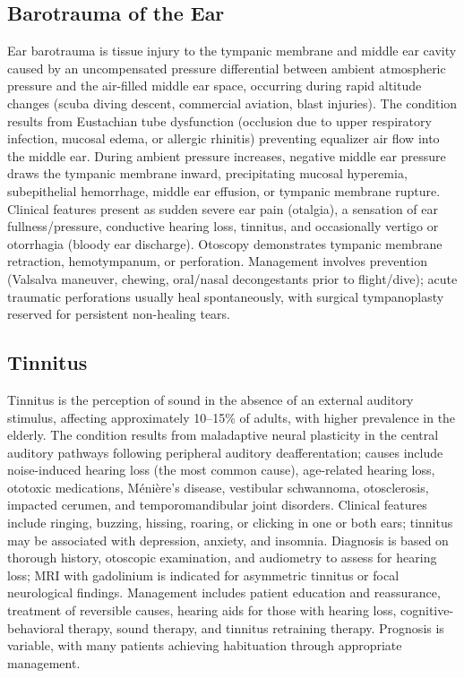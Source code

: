 
\subsection{Barotrauma of the Ear}
\label{sec:Barotrauma of the Ear}
Ear barotrauma is tissue injury to the tympanic membrane and middle ear cavity caused by an uncompensated pressure differential between ambient atmospheric pressure and the air-filled middle ear space, occurring during rapid altitude changes (scuba diving descent, commercial aviation, blast injuries). The condition results from Eustachian tube dysfunction (occlusion due to upper respiratory infection, mucosal edema, or allergic rhinitis) preventing equalizer air flow into the middle ear. During ambient pressure increases, negative middle ear pressure draws the tympanic membrane inward, precipitating mucosal hyperemia, subepithelial hemorrhage, middle ear effusion, or tympanic membrane rupture. Clinical features present as sudden severe ear pain (otalgia), a sensation of ear fullness/pressure, conductive hearing loss, tinnitus, and occasionally vertigo or otorrhagia (bloody ear discharge). Otoscopy demonstrates tympanic membrane retraction, hemotympanum, or perforation. Management involves prevention (Valsalva maneuver, chewing, oral/nasal decongestants prior to flight/dive); acute traumatic perforations usually heal spontaneously, with surgical tympanoplasty reserved for persistent non-healing tears.

\subsection{Tinnitus}
\label{sec:Tinnitus}
Tinnitus is the perception of sound in the absence of an external auditory stimulus, affecting approximately 10--15\% of adults, with higher prevalence in the elderly. The condition results from maladaptive neural plasticity in the central auditory pathways following peripheral auditory deafferentation; causes include noise-induced hearing loss (the most common cause), age-related hearing loss, ototoxic medications, M\'{e}ni\`{e}re's disease, vestibular schwannoma, otosclerosis, impacted cerumen, and temporomandibular joint disorders. Clinical features include ringing, buzzing, hissing, roaring, or clicking in one or both ears; tinnitus may be associated with depression, anxiety, and insomnia. Diagnosis is based on thorough history, otoscopic examination, and audiometry to assess for hearing loss; MRI with gadolinium is indicated for asymmetric tinnitus or focal neurological findings. Management includes patient education and reassurance, treatment of reversible causes, hearing aids for those with hearing loss, cognitive-behavioral therapy, sound therapy, and tinnitus retraining therapy. Prognosis is variable, with many patients achieving habituation through appropriate management.

